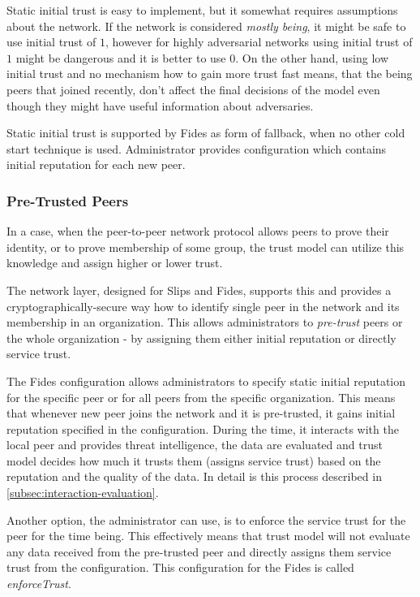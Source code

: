 Static initial trust is easy to implement, but it somewhat requires assumptions about the network. If the network is considered \textit{mostly being}, it might be safe to use initial trust of $1$, however for highly adversarial networks using initial trust of $1$ might be dangerous and it is better to use $0$. 
On the other hand, using low initial trust and no mechanism how to gain more trust fast means, that the being peers that joined recently, don't affect the final decisions of the model even though they might have useful information about adversaries.

Static initial trust is supported by Fides as form of fallback, when no other cold start technique is used. Administrator provides configuration which contains initial reputation for each new peer.

\subsubsection{Pre-Trusted Peers}
In a case, when the peer-to-peer network protocol allows peers to prove their identity, or to prove membership of some group, the trust model can utilize this knowledge and assign higher or lower trust.

The network layer, designed for Slips and Fides, supports this\cite{nl} and provides a cryptographically-secure way how to identify single peer in the network and its membership in an organization.
This allows administrators to \textit{pre-trust} peers or the whole organization - by assigning them either initial reputation or directly service trust.

The Fides configuration allows administrators to specify static initial reputation for the specific peer or for all peers from the specific organization. 
This means that whenever new peer joins the network and it is pre-trusted, it gains initial reputation specified in the configuration.
During the time, it interacts with the local peer and provides threat intelligence, the data are evaluated and trust model decides how much it trusts them (assigns service trust) based on the reputation and the quality of the data. In detail is this process described in \ref{subsec:interaction-evaluation}.

Another option, the administrator can use, is to enforce the service trust for the peer for the time being. This effectively means that trust model will not evaluate any data received from the pre-trusted peer and directly assigns them service trust from the configuration. This configuration for the Fides is called \textit{enforceTrust}.

